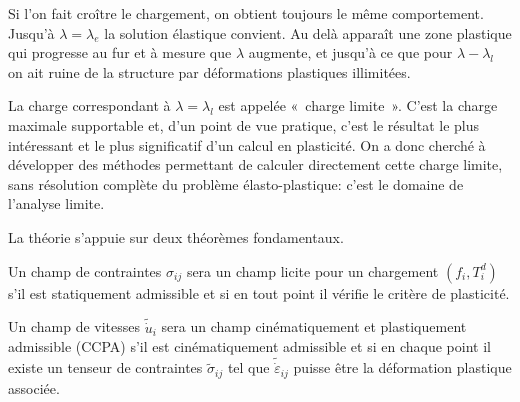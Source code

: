 Si l'on fait croître le chargement, on obtient toujours le même comportement.
Jusqu'à $\lambda=\lambda_e$ la solution élastique convient.
Au delà apparaît une zone plastique qui progresse au fur et à mesure que $\lambda$ augmente, et jusqu'à ce que pour $\lambda-\lambda_l$ on ait ruine de la structure par déformations plastiques illimitées. 

La charge correspondant à $\lambda=\lambda_l$ est appelée «~charge limite~».
C'est la charge maximale supportable et, d'un point de vue pratique, c'est le résultat le plus intéressant et le plus significatif d'un calcul en plasticité.
On a donc cherché à développer des méthodes permettant de calculer directement cette charge limite, sans résolution complète du problème élasto-plastique: c'est le domaine de l'analyse limite. 

La théorie s'appuie sur deux théorèmes fondamentaux. 
\begin{deff}
    Un champ de contraintes $\hat{\sigma}_{ij}$ sera un champ licite pour un chargement $(f_i,T_i^d)$ s'il est statiquement admissible et si en tout point il vérifie le critère de plasticité. 
\end{deff}
\begin{deff}
    Un champ de vitesses $\tilde{\dot{u}}_i$ sera un champ cinématiquement et plastiquement admissible (CCPA) s'il est cinématiquement admissible et si en chaque point il existe un  tenseur de contraintes $\tilde{\sigma}_{ij}$ tel que $\tilde{\dot{\varepsilon}}_{ij}$ puisse être la déformation plastique associée.  
\end{deff}

